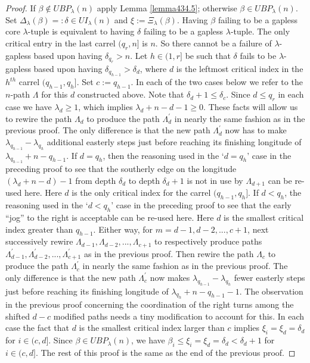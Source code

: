 \documentclass[11pt]{article}
\theoremstyle{definition}
\theoremstyle{remark}
\numberwithin{equation}{section}
\begin{document}
\begin{spacing}{1.35}
\begin{proof}If $\beta \notin UBP_\lambda(n)$ apply Lemma \ref{lemma434.5};  otherwise $\beta \in UBP_\lambda(n)$.  Set $\Delta_\lambda(\beta) =: \delta \in UI_\lambda(n)$ and $\xi := \Xi_\lambda(\beta)$.  Having $\beta$ failing to be a gapless core $\lambda$-tuple is equivalent to having $\delta$ failing to be a gapless $\lambda$-tuple.  The only critical entry in the last carrel $(q_r, n]$ is $n$.  So there cannot be a failure of $\lambda$-gapless based upon having $\delta_{q_r} > n$.  Let $h \in (1, r]$ be such that $\delta$ fails to be $\lambda$-gapless based upon having $\delta_{q_{h-1}} > \delta_d$, where $d$ is the leftmost critical index in the $h^{th}$ carrel $(q_{h-1},q_h]$.  Set $c := q_{h-1}$.  In each of the two cases below we refer to the $n$-path $\Lambda$ for this $d$ constructed above.  Note that $\delta_d + 1 \leq \delta_c$.  Since $d \leq q_r$ in each case we have $\lambda_d \geq 1$, which implies $\lambda_d+n-d-1 \geq 0$.  These facts will allow us to rewire the path $\Lambda_d$ to produce the path $\Lambda_d^\prime$ in nearly the same fashion as in the previous proof.  The only difference is that the new path $\Lambda_d^\prime$ now has to make $\lambda_{q_{h-1}} - \lambda_{q_h}$ additional easterly steps just before reaching its finishing longitude of $\lambda_{q_{h-1}}+n- q_{h-1}$.  If $d = q_h$, then the reasoning used in the `$d = q_h$' case in the preceding proof to see that the southerly edge on the longitude $(\lambda_d+n-d)-1$ from depth $\delta_d$ to depth $\delta_d +1$ is not in use by $\Lambda_{d+1}$ can be re-used here.  Here $d$ is the only critical index for the carrel $(q_{h-1}, q_{h}]$.  If $d < q_h$, the reasoning used in the `$d < q_h$' case in the preceding proof to see that the early ``jog'' to the right is acceptable can be re-used here.  Here $d$ is the smallest critical index greater than $q_{h-1}$.  Either way, for $m = d-1, d-2, ... , c+1$, next successively rewire $\Lambda_{d-1}, \Lambda_{d-2}, ... , \Lambda_{c+1}$ to respectively produce paths $\Lambda_{d-1}^\prime, \Lambda_{d-2}^\prime, ... , \Lambda_{c+1}^\prime$ as in the previous proof.  Then rewire the path $\Lambda_c$ to produce the path $\Lambda_c^\prime$ in nearly the same fashion as in the previous proof.  The only difference is that the new path $\Lambda_c^\prime$ now makes $\lambda_{q_{h-1}}-\lambda_{q_h}$ fewer easterly steps just before reaching its finishing longitude of $\lambda_{q_h}+n-q_{h-1}-1$.  The observation in the previous proof concerning the coordination of the right turns among the shifted $d-c$ modified paths needs a tiny modification to account for this.  In each case the fact that $d$ is the smallest critical index larger than $c$ implies $\xi_i = \xi_d = \delta_d$ for $i \in (c,d]$.  Since $\beta \in UBP_\lambda(n)$, we have $\beta_i \leq \xi_i = \xi_d = \delta_d < \delta_d+1$ for $i \in (c,d]$.  The rest of this proof is the same as the end of the previous proof.  \end{proof}




\end{spacing}
\end{document}

